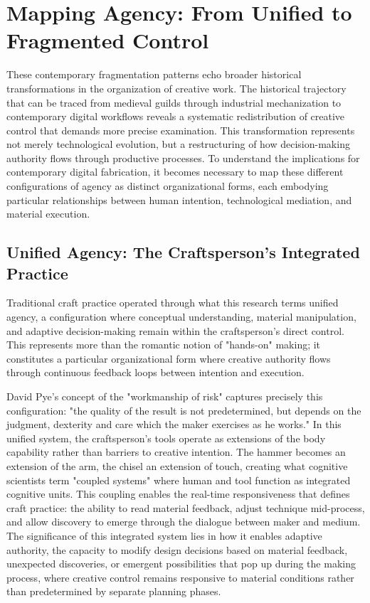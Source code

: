 \section{Mapping Agency: From Unified to Fragmented Control}

These contemporary fragmentation patterns echo broader historical transformations in the organization of creative work. The historical trajectory that can be traced from medieval guilds through industrial mechanization to contemporary digital workflows reveals a systematic redistribution of creative control that demands more precise examination. This transformation represents not merely technological evolution, but a restructuring of how decision-making authority flows through productive processes. To understand the implications for contemporary digital fabrication, it becomes necessary to map these different configurations of agency as distinct organizational forms, each embodying particular relationships between human intention, technological mediation, and material execution.

\subsection{Unified Agency: The Craftsperson's Integrated Practice}

Traditional craft practice operated through what this research terms unified agency, a configuration where conceptual understanding, material manipulation, and adaptive decision-making remain within the craftsperson's direct control. This represents more than the romantic notion of "hands-on" making; it constitutes a particular organizational form where creative authority flows through continuous feedback loops between intention and execution.

\vspace{0.5cm}

David Pye's concept of the "workmanship of risk" captures precisely this configuration: "the quality of the result is not predetermined, but depends on the judgment, dexterity and care which the maker exercises as he works." In this unified system, the craftsperson's tools operate as extensions of the body capability rather than barriers to creative intention. The hammer becomes an extension of the arm, the chisel an extension of touch, creating what cognitive scientists term "coupled systems" where human and tool function as integrated cognitive units. This coupling enables the real-time responsiveness that defines craft practice: the ability to read material feedback, adjust technique mid-process, and allow discovery to emerge through the dialogue between maker and medium. The significance of this integrated system lies in how it enables adaptive authority, the capacity to modify design decisions based on material feedback, unexpected discoveries, or emergent possibilities that pop up during the making process, where creative control remains responsive to material conditions rather than predetermined by separate planning phases.


